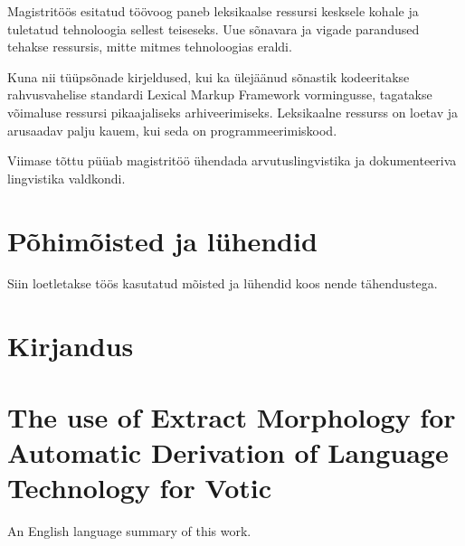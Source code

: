 \documentclass[12pt,a4paper]{article}
\begin{document}
Magistritöös esitatud töövoog paneb leksikaalse ressursi kesksele kohale ja tuletatud tehnoloogia sellest teiseseks. Uue sõnavara ja vigade parandused tehakse ressursis, mitte mitmes tehnoloogias eraldi.

Kuna nii tüüpsõnade kirjeldused, kui ka ülejäänud sõnastik kodeeritakse rahvusvahelise standardi Lexical Markup Framework vormingusse, tagatakse võimaluse ressursi pikaajaliseks arhiveerimiseks. Leksikaalne ressurss on loetav ja arusaadav palju kauem, kui seda on programmeerimiskood.

Viimase tõttu püüab magistritöö ühendada arvutuslingvistika ja dokumenteeriva lingvistika valdkondi.







\newpage
\section{Põhimõisted ja lühendid}
Siin loetletakse töös kasutatud mõisted ja lühendid koos nende tähendustega.

\glsaddall
\printglossary[title={},toctitle={}]








\newpage
\section{Kirjandus}
\label{sec:kirjandus}
{
  \printbibliography[heading=none]
}







\newpage
\section{The use of Extract Morphology for Automatic Derivation of Language Technology for Votic}

An English language summary of this work.
\end{document}
